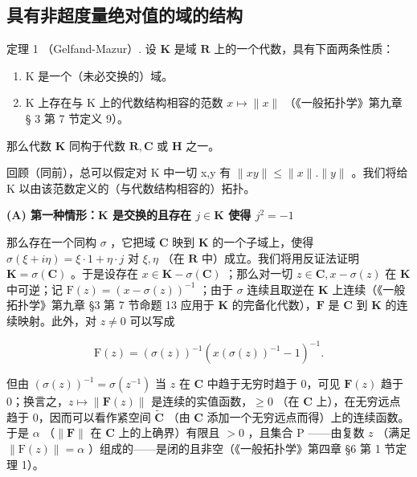 \subsection{具有非超度量绝对值的域的结构}

定理 1 （Gelfand-Mazur）. 设 \(\mathbf{K}\) 是域 \(\mathbf{R}\) 上的一个代数，具有下面两条性质：

\begin{enumerate}
\def\labelenumi{(\arabic{enumi})}
\item
  K 是一个（未必交换的）域。
\item
  K 上存在与 K 上的代数结构相容的范数 \(x \mapsto \| x \|\) （《一般拓扑学》第九章 § 3 第 7 节定义 9）。
\end{enumerate}

那么代数 \(\mathbf{K}\) 同构于代数 \(\mathbf{R},\mathbf{C}\) 或 \(\mathbf{H}\) 之一。

回顾（同前），总可以假定对 K 中一切 x,y 有 \(\|xy\|\leqslant\|x\|. \|y\|\) 。我们将给 K 以由该范数定义的（与代数结构相容的）拓扑。

\textbf{(A) 第一种情形：\(\mathbf{K}\) 是交换的且存在 \(j\in \mathbf{K}\) 使得 \(j^2 = -1\)}\par

那么存在一个同构 \(\sigma\) ，它把域 \(\mathbf{C}\) 映到 \(\mathbf{K}\) 的一个子域上，使得 \(\sigma(\xi + i\eta) = \xi \cdot 1 + \eta \cdot j\) 对 \(\xi, \eta\) （在 \(\mathbf{R}\) 中）成立。我们将用反证法证明 \(\mathbf{K} = \sigma(\mathbf{C})\) 。于是设存在 \(x \in \mathbf{K} - \sigma(\mathbf{C})\) ；那么对一切 \(z \in \mathbf{C}, x - \sigma(z)\) 在 \(\mathbf{K}\) 中可逆；记 \(\mathrm{F}(z) = (x - \sigma(z))^{-1}\) ；由于 \(\sigma\) 连续且取逆在 \(\mathbf{K}\) 上连续（《一般拓扑学》第九章 §3 第 7 节命题 13 应用于 \(\mathbf{K}\) 的完备化代数），\(\mathbf{F}\) 是 \(\mathbf{C}\) 到 \(\mathbf{K}\) 的连续映射。此外，对 \(z \neq 0\) 可以写成

\[
\mathrm{F} (z) = (\sigma (z)) ^ {- 1} (x (\sigma (z)) ^ {- 1} - 1) ^ {- 1}.
\]

但由 \((\sigma(z))^{-1} = \sigma(z^{-1})\) 当 \(z\) 在 \(\mathbf{C}\) 中趋于无穷时趋于 0，可见 \(\mathbf{F}(z)\) 趋于 0；换言之，\(z \mapsto \| \mathbf{F}(z) \|\) 是连续的实值函数，\(\geqslant 0\) （在 \(\mathbf{C}\) 上），在无穷远点趋于 0，因而可以看作紧空间 \(\tilde{\mathbf{C}}\) （由 \(\mathbf{C}\) 添加一个无穷远点而得）上的连续函数。于是 \(\alpha\) （\(\| \mathbf{F} \|\) 在 \(\mathbf{C}\) 上的上确界）有限且 \(>0\) ，且集合 \(\mathrm{P}\) ——由复数 \(z\) （满足 \(\| \mathrm{F}(z) \| = \alpha\) ）组成的——是闭的且非空（《一般拓扑学》第四章 §6 第 1 节定理 1）。

